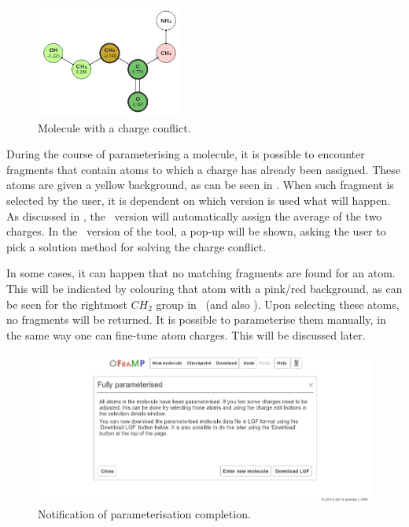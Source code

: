\begin{figure}
\center
\includegraphics[height=140px]{img/conflict.png}
\caption{Molecule with a charge conflict.}
\end{figure}

During the course of parameterising a molecule, it is possible to encounter fragments that contain atoms to which a charge has already been assigned. These atoms are given a yellow background, as can be seen in . When such fragment is selected by the user, it is dependent on which \oframp{} version is used what will happen. As discussed in , the \IDb\ version will automatically assign the average of the two charges. In the \IDa\ version of the tool, a pop-up will be shown, asking the user to pick a solution method for solving the charge conflict.

In some cases, it can happen that no matching fragments are found for an atom. This will be indicated by colouring that atom with a pink/red background, as can be seen for the rightmost $CH_{2}$ group in ~(and also ). Upon selecting these atoms, no fragments will be returned. It is possible to parameterise them manually, in the same way one can fine-tune atom charges. This will be discussed later.

\begin{figure}
\center
\includegraphics[width=.9\textwidth]{img/finished.png}
\caption{Notification of parameterisation completion.}
\end{figure}

